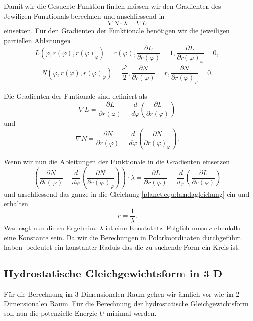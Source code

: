 Damit wir die Gesuchte Funktion finden müssen wir den Gradienten des Jewiligen Funktionals berechnen und anschliessend in
\begin{equation}
	\nabla N \cdot \lambda = \nabla L
	\label{planet:equ:lamdagleichung}
\end{equation}
einsetzen.
Für den Gradienten der Funktionale benötigen wir die jeweiligen partiellen Ableitungen
\begin{equation*}
	L(\varphi ,r(\varphi),r(\varphi)_\varphi) = r(\varphi),
	\frac{\partial L}{\partial r(\varphi)} = 1,
	\frac{\partial L}{\partial r(\varphi)_\varphi} = 0,
\end{equation*}
\begin{equation*}
	N(\varphi ,r(\varphi),r(\varphi)_\varphi) = \frac{r^2}{2} ,
	\frac{\partial N}{\partial r(\varphi)} = r,
	\frac{\partial N}{\partial r(\varphi)_\varphi} = 0.
\end{equation*}

Die Gradienten der Funtionale sind definiert als 
\begin{equation*}
	\nabla L = 
	\frac{\partial L}{\partial r(\varphi)}-  \frac{d}{d\varphi}\left( \frac{\partial L}{\partial r(\varphi)} \right)
\end{equation*}
und
\begin{equation*}
	\nabla N = \frac{\partial N}{\partial r(\varphi)} - \frac{d}{d\varphi}\left(\frac{\partial N}{\partial r(\varphi)_\varphi}\right).
\end{equation*}

Wenn wir nun die Ableitungen der Funktionale in die Gradienten einsetzen
\begin{equation*}
	\left(\frac{\partial N}{\partial r(\varphi)} - \frac{d}{d\varphi}\left(\frac{\partial N}{\partial r(\varphi)_\varphi}\right)\right)\cdot \lambda = \frac{\partial L}{\partial r(\varphi)}-  \frac{d}{d\varphi}\left( \frac{\partial L}{\partial r(\varphi)} \right)
\end{equation*} 
und anschliessend das ganze in die Gleichung \ref{planet:equ:lamdagleichung}
ein und erhalten
\begin{equation*}
	r = \frac{1}{\lambda}.
\end{equation*}
Was sagt nun dieses Ergebniss.
\(\lambda\) ist eine Konstatnte.
Folglich muss \(r\) ebenfalls eine Konstante sein.
Da wir die Berechungen in Polarkoordinaten durchgeführt haben, bedeutet ein konstanter Raduis das die zu suchende Form ein Kreis ist.

\subsection{Hydrostatische Gleichgewichtsform in 3-D}
Für die Berechnung im 3-Dimensionalen Raum gehen wir ähnlich vor wie im 2-Dimensionalen Raum.
Für die Berechnung der hydrostatische Gleichgewichtsform soll nun die potenzielle Energie \(U\) minimal werden.

